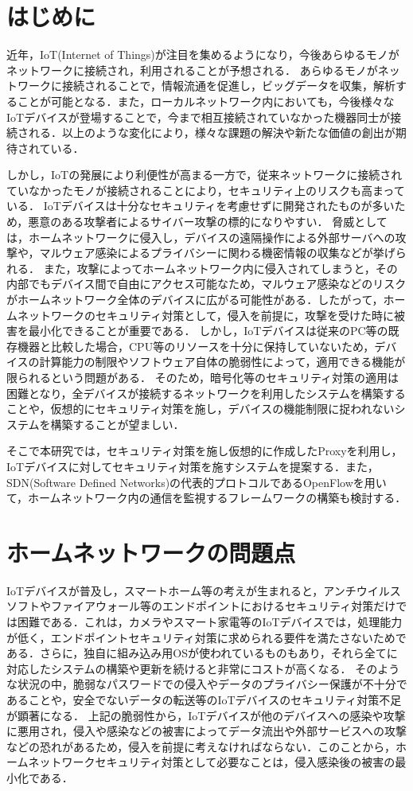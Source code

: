 \documentclass[Japanese]{dicomopapers}
\begin{document}
\section{はじめに}
近年，IoT(Internet of Things)が注目を集めるようになり，今後あらゆるモノがネットワークに接続され，利用されることが予想される．
あらゆるモノがネットワークに接続されることで，情報流通を促進し，ビッグデータを収集，解析することが可能となる．また，ローカルネットワーク内においても，今後様々なIoTデバイスが登場することで，今まで相互接続されていなかった機器同士が接続される．以上のような変化により，様々な課題の解決や新たな価値の創出が期待されている．\par
しかし，IoTの発展により利便性が高まる一方で，従来ネットワークに接続されていなかったモノが接続されることにより，セキュリティ上のリスクも高まっている\cite{security}．
IoTデバイスは十分なセキュリティを考慮せずに開発されたものが多いため，悪意のある攻撃者によるサイバー攻撃の標的になりやすい．
脅威としては，ホームネットワークに侵入し，デバイスの遠隔操作による外部サーバへの攻撃や，マルウェア感染によるプライバシーに関わる機密情報の収集などが挙げられる．
また，攻撃によってホームネットワーク内に侵入されてしまうと，その内部でもデバイス間で自由にアクセス可能なため，マルウェア感染などのリスクがホームネットワーク全体のデバイスに広がる可能性がある．したがって，ホームネットワークのセキュリティ対策として，侵入を前提に，攻撃を受けた時に被害を最小化できることが重要である．
しかし，IoTデバイスは従来のPC等の既存機器と比較した場合，CPU等のリソースを十分に保持していないため，デバイスの計算能力の制限やソフトウェア自体の脆弱性によって，適用できる機能が限られるという問題がある\cite{disap}．
そのため，暗号化等のセキュリティ対策の適用は困難となり，全デバイスが接続するネットワークを利用したシステムを構築することや，仮想的にセキュリティ対策を施し，デバイスの機能制限に捉われないシステムを構築することが望ましい．\par
そこで本研究では，セキュリティ対策を施し仮想的に作成したProxyを利用し，IoTデバイスに対してセキュリティ対策を施すシステムを提案する．また，SDN(Software Defined Networks)の代表的プロトコルであるOpenFlow\cite{openflow}を用いて，ホームネットワーク内の通信を監視するフレームワークの構築も検討する．


\section{ホームネットワークの問題点}
IoTデバイスが普及し，スマートホーム等の考えが生まれると，アンチウイルスソフトやファイアウォール等のエンドポイントにおけるセキュリティ対策だけでは困難である．これは，カメラやスマート家電等のIoTデバイスでは，処理能力が低く，エンドポイントセキュリティ対策に求められる要件を満たさないためである\cite{camera}．さらに，独自に組み込み用OSが使われているものもあり，それら全てに対応したシステムの構築や更新を続けると非常にコストが高くなる．
そのような状況の中，脆弱なパスワードでの侵入やデータのプライバシー保護が不十分であることや，安全でないデータの転送等のIoTデバイスのセキュリティ対策不足が顕著になる\cite{owasp}．
上記の脆弱性から，IoTデバイスが他のデバイスへの感染や攻撃に悪用され，侵入や感染などの被害によってデータ流出や外部サービスへの攻撃などの恐れがあるため，侵入を前提に考えなければならない．このことから，ホームネットワークセキュリティ対策として必要なことは，侵入感染後の被害の最小化である．
\end{document}

